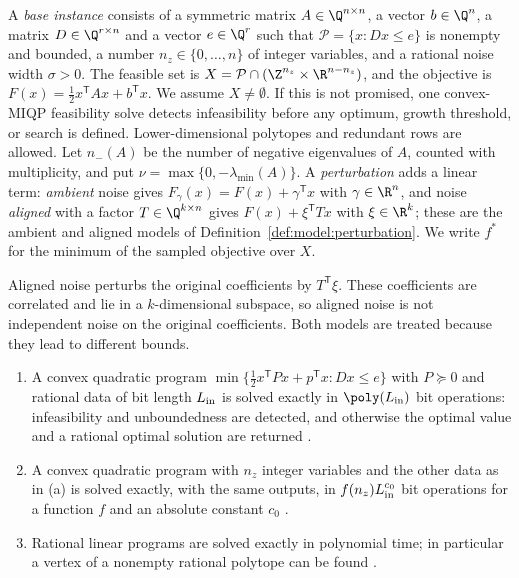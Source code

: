 \begin{definition}\label{def:qp:instance}
A \emph{base instance} consists of a symmetric matrix $A\in\Q^{n\times n}$,
a vector $b\in\Q^n$, a matrix $D\in\Q^{r\times n}$ and a vector $e\in\Q^r$
such that $\mathcal P=\{x:Dx\le e\}$ is nonempty and bounded, a number
$n_z\in\{0,\dots,n\}$ of integer variables, and a rational noise width
$\sigma>0$. The feasible set is
$X=\mathcal P\cap(\Z^{n_z}\times\R^{n-n_z})$, and the objective is
$F(x)=\frac12x^{\mathsf T} Ax+b^{\mathsf T} x$. We assume $X\ne\emptyset$.
If this is not promised, one convex-MIQP feasibility solve detects
infeasibility before any optimum, growth threshold, or search is defined.
Lower-dimensional polytopes and redundant
rows are allowed. Let $n_-(A)$ be the number of negative eigenvalues of $A$,
counted with multiplicity, and put $\nu=\max\{0,-\lambda_{\min}(A)\}$. A
\emph{perturbation} adds a linear term: \emph{ambient} noise gives
$F_\gamma(x)=F(x)+\gamma^{\mathsf T} x$ with $\gamma\in\R^n$, and noise
\emph{aligned} with a factor $T\in\Q^{k\times n}$ gives
$F(x)+\xi^{\mathsf T} Tx$ with $\xi\in\R^k$; these are the ambient and aligned
models of Definition~\ref{def:model:perturbation}. We write $f^*$ for the
minimum of the sampled objective over $X$.
\end{definition}

Aligned noise perturbs the original coefficients by $T^{\mathsf T}\xi$. These
coefficients are correlated and lie in a $k$-dimensional subspace, so aligned
noise is not independent noise on the original coefficients. Both models are
treated because they lead to different bounds.

\begin{proposition}\label{prop:qp:primitives}
\begin{enumerate}[label=(\alph*)]
\item A convex quadratic program $\min\{\frac12x^{\mathsf T} Px+p^{\mathsf T} x:Dx\le e\}$
 with $P\succeq0$ and rational data of bit length $L_{\rm in}$ is solved
 exactly in $\poly(L_{\rm in})$ bit operations: infeasibility and
 unboundedness are detected, and otherwise the optimal value and a rational
 optimal solution are returned
 \cite{kozlov1980-the-polynomial-solvability-of-convex}.
\item A convex quadratic program with $n_z$ integer variables and the other
 data as in (a) is solved exactly, with the same outputs, in
 $f(n_z)L_{\rm in}^{c_0}$ bit operations for a function $f$ and an absolute
 constant $c_0$ \cite[Theorem~3]{pia2025-convex-quadratic-sets-and-the}.
\item Rational linear programs are solved exactly in polynomial time; in
 particular a vertex of a nonempty rational polytope can be found
 \cite{grotschel1988-geometric-algorithms-and-combinatorial-optimization}.
\end{enumerate}
\end{proposition}

